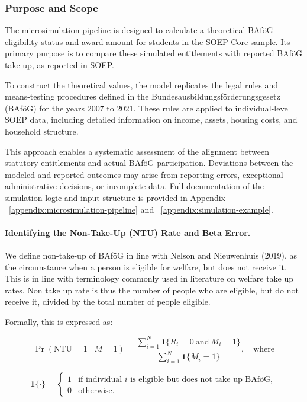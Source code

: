 \subsubsection{Purpose and Scope}
The microsimulation pipeline is designed to calculate a theoretical BAföG eligibility status and award amount for students in the SOEP-Core sample. 
Its primary purpose is to compare these simulated entitlements with reported BAföG take-up, as reported in SOEP.

To construct the theoretical values, the model replicates the legal rules and means-testing procedures defined in the Bundesausbildungsförderungsgesetz (BAföG) for the years 2007 to 2021. 
These rules are applied to individual-level SOEP data, including detailed information on income, assets, housing costs, and household structure.

This approach enables a systematic assessment of the alignment between statutory entitlements and actual BAföG participation. 
Deviations between the modeled and reported outcomes may arise from reporting errors, exceptional administrative decisions, or incomplete data. 
Full documentation of the simulation logic and input structure is provided in Appendix ~\ref{appendix:microsimulation-pipeline} and ~\ref{appendix:simulation-example}.

\paragraph{Identifying the Non-Take-Up (NTU) Rate and Beta Error.} %
We define non-take-up of BAföG in line with Nelson and Nieuwenhuis (2019), as the circumstance when a person is eligible for welfare, but does not receive it. This is in line with terminology commonly used in literature on welfare take up rates. Non take up rate is thus the number of people who are eligible, but do not receive it, divided by the total number of people eligible. 


Formally, this is expressed as:

\begin{equation}
\Pr(\text{NTU} = 1 \mid M = 1) = \frac{\sum_{i=1}^{N} \mathbf{1}\{R_i = 0 \ \text{and} \ M_i = 1\}}{\sum_{i=1}^{N} \mathbf{1}\{M_i = 1\}}, \quad\text{where} 
\end{equation}

\begin{equation}
  \mathbf{1}\{\cdot\} =
  \begin{cases}
  1 & \text{if individual } i \text{ is eligible but does not take up BAföG}, \\
  0 & \text{otherwise}.
  \end{cases}
\label{eq:indicator-function-ntu}
\end{equation}



